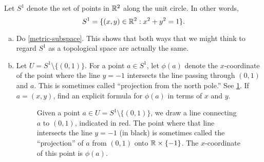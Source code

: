 \begin{exercise}   \label{circle-projection-atlas}
	Let $S^1$ denote the set of points in $\mathbb{R}^2$ along the unit circle. In other words,
	\[ S^1 = \{ (x, y) \in \mathbb{R}^2 : x^2 + y^2 = 1 \}. \]
	\begin{enumerate}[(a)]
		\item Do \cref{metric-subspace}. This shows that both ways that we might think to regard $S^1$ as a topological space are actually the same. 
		
		\item Let $U = S^1 \setminus \{(0,1)\}$. For a point $a \in S^1$, let $\phi(a)$ denote the $x$-coordinate of the point where the line $y = -1$ intersects the line passing through $(0,1)$ and $a$. This is sometimes called ``projection from the north pole.'' See \cref{circle-projection}. If $a = (x,y)$, find an explicit formula for $\phi(a)$ in terms of $x$ and $y$. 
		
		\begin{figure}
			\begin{center}
			\end{center}
			\caption{Given a point $a \in U = S^1 \setminus \{(0,1)\}$, we draw a line connecting $a$ to $(0,1)$, indicated in red. The point where that line intersects the line $y = -1$ (in black) is sometimes called the ``projection'' of $a$ from $(0,1)$ onto $\mathbb{R} \times \{-1\}$. The $x$-coordinate of this point is $\phi(a)$.}  \label{circle-projection}
		\end{figure}
		

\end{enumerate}
\end{exercise}
